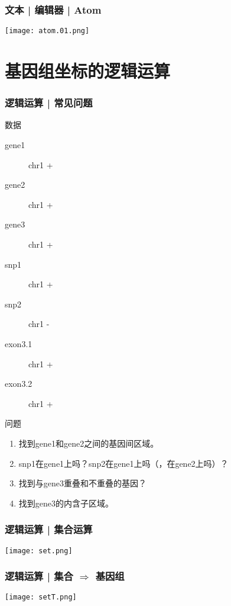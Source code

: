 \begin{frame}
  \frametitle{文本 | 编辑器 | Atom}
    \begin{center}
      \texttt{[image: atom.01.png]}
    \end{center}
\end{frame}

\section{基因组坐标的逻辑运算}
\begin{frame}
  \frametitle{逻辑运算 | 常见问题}
  \begin{block}{数据}
    \begin{description}
      \item[gene1] chr1   \quad +
      \item[gene2] chr1   \quad +
      \item[gene3] chr1   \quad +
      \item[snp1] chr1  \quad +
      \item[snp2] chr1  \quad -
      \item[exon3.1] chr1   \quad +
      \item[exon3.2] chr1   \quad +
    \end{description}
  \end{block}
  \vspace{-0.5em}
  \pause
  \begin{block}{问题}
    \begin{enumerate}
      \item 找到gene1和gene2之间的基因间区域。
      \item snp1在gene1上吗？snp2在gene1上吗（，在gene2上吗）？
      \item 找到与gene3重叠和不重叠的基因？
      \item 找到gene3的内含子区域。
    \end{enumerate}
  \end{block}
\end{frame}

\begin{frame}
  \frametitle{逻辑运算 | 集合运算}
    \begin{center}
      \texttt{[image: set.png]}
    \end{center}
\end{frame}

\begin{frame}
  \frametitle{逻辑运算 | 集合 $\Rightarrow$ 基因组}
    \begin{center}
      \texttt{[image: setT.png]}
    \end{center}
\end{frame}

